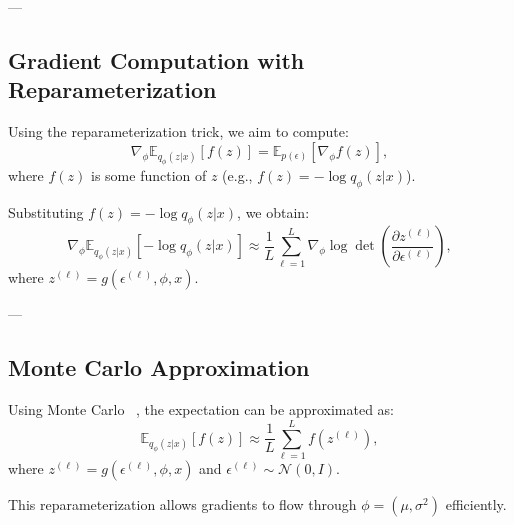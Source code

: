 ---

\subsection{Gradient Computation with Reparameterization}
Using the reparameterization trick, we aim to compute:
\[
\nabla_\phi \mathbb{E}_{q_\phi(z|x)}[f(z)] = \mathbb{E}_{p(\epsilon)}[\nabla_\phi f(z)],
\]
where \(f(z)\) is some function of \(z\) (e.g., \(f(z) = -\log q_\phi(z|x)\)).

Substituting \(f(z) = -\log q_\phi(z|x)\), we obtain:
\[
\nabla_\phi \mathbb{E}_{q_\phi(z|x)}[-\log q_\phi(z|x)] \approx \frac{1}{L} \sum_{\ell=1}^L \nabla_\phi \log \det \left( \frac{\partial z^{(\ell)}}{\partial \epsilon^{(\ell)}} \right),
\]
where \(z^{(\ell)} = g(\epsilon^{(\ell)}, \phi, x)\).

---

\subsection{Monte Carlo Approximation}
Using Monte Carlo ~\cite{james1980monte, kroese2014monte}, the expectation can be approximated as:
\[
\mathbb{E}_{q_\phi(z|x)}[f(z)] \approx \frac{1}{L} \sum_{\ell=1}^L f(z^{(\ell)}),
\]
where \(z^{(\ell)} = g(\epsilon^{(\ell)}, \phi, x)\) and \(\epsilon^{(\ell)} \sim \mathcal{N}(0, I)\).

This reparameterization allows gradients to flow through \(\phi = (\mu, \sigma^2)\) efficiently.

